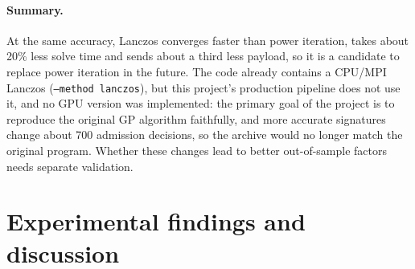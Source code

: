 \documentclass[11pt,a4paper]{article}
\newcommand{\code}[1]{\texttt{#1}}
\begin{document}
\paragraph{Summary.} At the same accuracy, Lanczos converges faster than power iteration, takes about 20\% less solve time and sends about a third less payload, so it is a candidate to replace power iteration in the future. The code already contains a CPU/MPI Lanczos (\code{--method lanczos}), but this project's production pipeline does not use it, and no GPU version was implemented: the primary goal of the project is to reproduce the original GP algorithm faithfully, and more accurate signatures change about 700 admission decisions, so the archive would no longer match the original program. Whether these changes lead to better out-of-sample factors needs separate validation.

\section{Experimental findings and discussion}
\label{sec:discussion}
\end{document}
